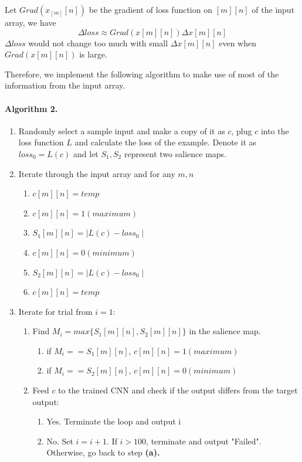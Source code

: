 \documentclass{article}
\begin{document}
Let $Grad(x_[m][n])$ be the gradient of loss function on $[m][n]$ of the input array, we have 
\begin{equation}
	\Delta loss \approx Grad(x[m][n])\Delta x[m][n]
\end{equation}
$\Delta loss$ would not change too much with small $\Delta x[m][n]$ even when $Grad(x[m][n])$ is large.

Therefore, we implement the following algorithm to make use of most of the information from the input array.

\paragraph{Algorithm 2.}
\begin{enumerate}
	\item Randomly select a sample input and make a copy of it as $c$, plug $c$ into the loss function $L$ and calculate the loss of the example. Denote it as $loss_0=L(c)$ and let $S_1,S_2$ represent two salience maps.
	\item Iterate through the input array and for any $m,n$
		\begin{enumerate}
			\item $c[m][n]=temp$
			\item $c[m][n]=1(maximum)$
			\item $S_1[m][n]= \mid L(c) - loss_0 \mid$
			\item $c[m][n]=0(minimum)$
			\item $S_2[m][n]=\mid L(c) - loss_0 \mid$
			\item $c[m][n]=temp$
		\end{enumerate}

	\item Iterate for trial from $i=1$:
		\begin{enumerate}
			\item Find $M_i=max\{S_1[m][n],S_2[m][n]\}$ in the salience map.
				\begin{enumerate}
					\item if $M_i==S_1[m][n]$, $c[m][n]=1(maximum)$
					\item if $M_i==S_2[m][n]$, $c[m][n]=0(minimum)$
				\end{enumerate}
			\item Feed $c$ to the trained CNN and check if the output differs from the target output:
				\begin{enumerate}
					\item Yes. Terminate the loop and output i
					\item No. Set $i=i+1$. If $i > 100$, terminate and output "Failed". Otherwise, go back to step \textbf{(a).}
				\end{enumerate}
		\end{enumerate}
\end{enumerate}
\end{document}
